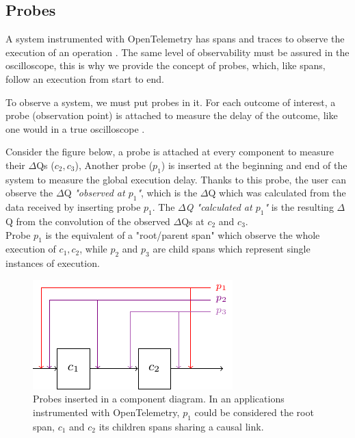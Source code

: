 \subsection{Probes}

A system instrumented with OpenTelemetry has spans and traces to observe the execution of an operation \cite{otel-t}. The same level of observability must be assured in the oscilloscope, this is why we provide the concept of probes, which, like spans, follow an execution from start to end.

To observe a system, we must put probes in it. For each outcome of interest, a probe (observation point) is attached to measure the delay of the outcome, like one would in a true oscilloscope \cite{post}.

Consider the figure below, a probe is attached at every component to measure their $\Delta$Qs ($c_2, c_3$),  Another probe ($p_1$) is inserted at the beginning and end of the system to measure the global execution delay. Thanks to this probe, the user can observe the $\Delta$Q \textit{"observed at $p_1$"}, which is the $\Delta$Q which was calculated from the data received by inserting probe $p_1$. The \textit{$\Delta$Q "calculated at $p_1$"} is the resulting $\Delta$Q from the convolution of the observed $\Delta$Qs at $c_2$ and $c_3$. \\
Probe $p_1$ is the equivalent of a "root/parent span" which observe the whole execution of $c_1, c_2$, while $p_2$ and $p_3$ are child spans which represent single instances of execution.

    \begin{figure}[H]
        \begin{center}
            \includegraphics[scale=1.8]{tikz/probes.pdf}
        \end{center}
        \caption{Probes inserted in a component diagram. In an applications instrumented with OpenTelemetry, $p_1$ could be considered the root span, $c_1$ and $c_2$ its children spans sharing a causal link.}
        \label{fig:probes}
    \end{figure}



